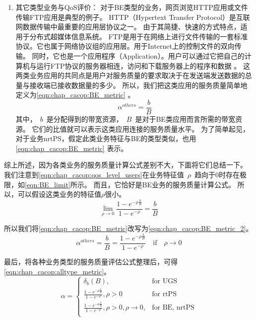 \begin{enumerate}[(1)]
\item 其它类型业务与QoS评价：
对于BE类型的业务，网页浏览HTTP应用或文件传输FTP应用是典型的例子。
HTTP（Hypertext Transfer Protocol）是互联网数据传输中最重要的应用层协议之一\cite{Fielding_1999}。 
由于其简捷、快速的方式特点，适用于分布式超媒体信息系统。
FTP是用于在网络上进行文件传输的一套标准协议。它也属于网络协议组的应用层。用于Internet上的控制文件的双向传输。
同时，它也是一个应用程序（Application）。用户可以通过它把自己的计算机与运行FTP协议的服务器相连，访问和下载服务器上的程序和数据 \cite{Postel_Reynolds_1985}。
这两类业务应用的共同点是用户对服务质量的要求取决于在发送端发送数据的总量与接收端已接收数据量的多少。
所以，我们把这类应用的服务质量简单地定义为\eqref{eqn:chap_cacop:BE_metric} 。
%
\begin{equation}
\label{eqn:chap_cacop:BE_metric}
\alpha^{others} = \frac{b}{B}
\end{equation}
%
其中，~$b$~是分配得到的带宽资源，~$B$~是对于BE类应用而言所需的带宽资源。
它们的比值就可以表示这类应用连接的服务质量水平。
为了简单起见，对于业务nrtPS，假定此类业务特征与BE的类型类似，也用 \eqref{eqn:chap_cacop:BE_metric} 表示。
\end{enumerate}

综上所述，因为各类业务的服务质量计算公式差别不大，下面将它们总结一下。
我们注意到\eqref{eqn:chap_cacop:qos_level_users}在业务特征值~$\rho$~趋向于$0$时存在极限，如\eqref{eqn:BE_limit}所示。
而且，它恰好是BE业务的服务质量计算公式。 所以，可以假设这类业务的特征值$\rho$很小。
%
\begin{equation}
\label{eqn:BE_limit}
\lim\limits_{\rho \to 0 } \frac{1- e^{-\rho \frac{b}{B} }}{1-e^{-\rho}} = \frac{b}{B}
\end{equation}

所以我们将\eqref{eqn:chap_cacop:BE_metric}改写为\eqref{eqn:chap_cacop:BE_metric_2}。
%
\begin{equation}
\label{eqn:chap_cacop:BE_metric_2}
\alpha^{others} = \frac{b}{B} = \frac{1- e^{-\rho \frac{b}{B} }}{1-e^{-\rho}} \quad \text{if} \quad \rho \to 0
\end{equation}
%

最后，将各种业务类型的服务质量评估公式整理后，可得\eqref{eqn:chap_cacop:alltype_metric}。
%
\begin{equation}
\alpha = 
\begin{cases}
\delta_{b}(B), &\text{for UGS} \\
\frac{1- e^{-\rho \frac{b}{B} }}{1-e^{-\rho}}, \rho > 0& \text{for rtPS }\\
\frac{1- e^{-\rho \frac{b}{B} }}{1-e^{-\rho}}, \rho>0, \rho \to 0, &\text{for BE, nrtPS}\\
\end{cases}
\label{eqn:chap_cacop:alltype_metric}
\end{equation}

